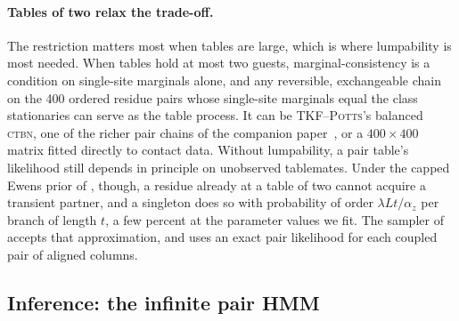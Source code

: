 \documentclass[11pt]{article}
\newcommand{\Potts}{\textsc{TKF--Potts}}
\newcommand{\CTBN}{\textsc{ctbn}}
\begin{document}
\paragraph{Tables of two relax the trade-off.} The restriction matters most
when tables are large, which is where lumpability is most needed. When
tables hold at most two guests, marginal-consistency is a condition on
single-site marginals alone, and any reversible, exchangeable chain on the
400 ordered residue pairs whose single-site marginals equal the class
stationaries can serve as the table process. It can be \Potts's balanced
\CTBN, one of the richer pair chains of the companion
paper~\citep{LargeHolmes2026Coupled}, or a $400\times400$ matrix fitted
directly to contact data. Without lumpability, a pair table's likelihood still
depends in principle on unobserved tablemates. Under the capped Ewens prior
of , though, a residue already at a table of two cannot
acquire a transient partner, and a singleton does so with probability of
order $\lambda Lt/\alpha_z$ per branch of length $t$, a few percent at the
parameter values we fit. The sampler of  accepts that
approximation, and uses an exact pair likelihood for each coupled pair of
aligned columns.

\subsection{Inference: the infinite pair HMM}
\label{sec:iphmm}
\end{document}
